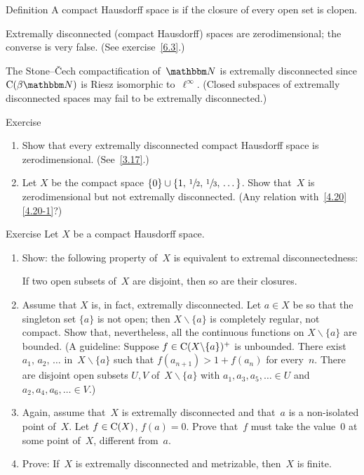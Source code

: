 \documentclass[main.tex]{subfiles}
\begin{document}
%
\begin{psec}{6.2}{Definition}
A compact Hausdorff space is
if the closure of every open set is clopen.

Extremally disconnected (compact Hausdorff) spaces are
zerodimensional;
the converse is very false.
(See exercise~\ref{6.3}.)

The Stone--\v{C}ech compactification of~$\N$
is extremally disconnected
since $\Cont{\beta\N}$ is Riesz isomorphic to~$\ell^\infty$.
(Closed subspaces of extremally disconnected spaces
may fail to be extremally disconnected.)
\end{psec}
%
%
\begin{psec}{6.3}{Exercise}
\begin{enumerate}
\item\label{6.3-1}
Show that every extremally disconnected
compact Hausdorff space is zerodimensional. (See~\ref{3.17}.)
%
\item\label{6.3-2}
Let $X$ be the compact space
$\{0\}\cup\{1,\,\sfrac{1}{2},\,\sfrac{1}{3},\,\dotsc\}$.
Show that~$X$ is zerodimensional
but not extremally disconnected.
(Any relation with~\ref{4.20}\ref{4.20-1}?)
\end{enumerate}
\end{psec}
%
%
\begin{psec}{6.4}{Exercise}
Let $X$ be a compact Hausdorff space.
\begin{enumerate}
\item\label{6.4-1}
Show: the following property of~$X$
is equivalent to extremal disconnectedness:
\begin{center}
\begin{minipage}{.45\textwidth}
If two open subsets of~$X$
are disjoint,
then so are their closures.
\end{minipage}
\end{center}
\vspace{.5em}
%
\item\label{6.4-2}
Assume that $X$ is, in fact, extremally disconnected.
Let $a\in X$ be so that the singleton set $\{a\}$ is not open;
then $X\backslash\{a\}$ is completely regular, not compact.
Show that, nevertheless,
all the continuous functions on $X\backslash\{a\}$ are bounded.
(A guideline:
Suppose $f\in\mathrm{C}(X\backslash\{a\})^+$ is unbounded.
There exist $a_1,\,a_2,\,\dotsc$ in~$X\backslash\{a\}$
such that $f(a_{n+1})>1+f(a_n)$ for every~$n$.
There are disjoint open subsets $U,V$ of~$X\backslash\{a\}$
with $a_1,a_3,a_5,\dotsc\in U$
and $a_2,a_4,a_6,\dotsc\in V$.)
%
\item\label{6.4-3}
Again, assume that~$X$ is extremally disconnected
and that~$a$ is a non-isolated point of~$X$.
Let $f\in\mathrm{C}(X)$, $f(a)=0$.
Prove that~$f$ must take the value~$0$ at some point of~$X$,
different from~$a$.
%
\item\label{6.4-4}
Prove:
If~$X$ is extremally disconnected
and metrizable,
then~$X$ is finite.
\end{enumerate}
\end{psec}
\end{document}
